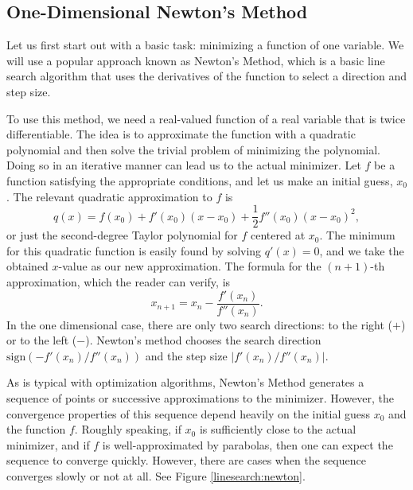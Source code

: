 \subsection*{One-Dimensional Newton's Method}
Let us first start out with a basic task: minimizing a function of one variable.
We will use a popular approach known as Newton's Method, which is a basic line search
algorithm that uses the derivatives of the function to select a direction and
step size.

To use this method, we need a real-valued function of a real variable that is twice
differentiable. The idea is to approximate the function with a quadratic polynomial and
then solve the trivial problem of minimizing the polynomial. Doing so in an iterative
manner can lead us to the actual minimizer. Let $f$ be a function satisfying the
appropriate conditions, and let us make an initial guess, $x_0$. The relevant quadratic
approximation to $f$ is
\begin{equation*}
q(x) = f(x_0) + f'(x_0)(x-x_0) + \frac{1}{2}f''(x_0)(x-x_0)^2,
\end{equation*}
or just the second-degree Taylor polynomial for $f$ centered at $x_0$. The minimum
for this quadratic function is easily found by solving $q'(x) = 0$, and we take the
obtained $x$-value as our new approximation. The formula for the $(n+1)$-th
approximation, which the reader can verify, is
\begin{equation*}
x_{n+1} = x_n - \frac{f'(x_n)}{f''(x_n)}.
\end{equation*}
In the one dimensional case, there are only two search directions: to the right ($+$)
or to the left ($-$). Newton's method chooses the search direction 
$\text{sign}(-f'(x_n)/f''(x_n))$ and the step size $|f'(x_n)/f''(x_n)|$.

As is typical with optimization algorithms, Newton's Method generates a sequence of
points or successive approximations to the minimizer. However, the convergence
properties of this sequence depend heavily on the initial guess $x_0$ and the function
$f$. Roughly speaking, if $x_0$ is sufficiently close to the actual minimizer, and if
$f$ is well-approximated by parabolas, then one can expect the sequence to converge
quickly. However, there are cases when the sequence converges slowly or not at all.
See Figure \ref{linesearch:newton}.

